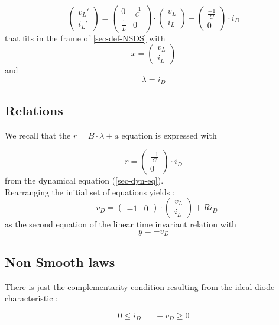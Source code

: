 \documentclass[10pt]{article}
\begin{document}
\[
\left( \begin{array}{c}
v_L'\\
i_L'
\end{array} \right)
=
\left( \begin{array}{cc}
0 & \frac{-1}{C}\\
\frac{1}{L} & 0
\end{array} \right)
 \cdot
\left( \begin{array}{c}
v_L\\
i_L
\end{array} \right)
+
\left( \begin{array}{c}
\frac{-1}{C}\\
 0
\end{array} \right)
 \cdot i_D
\]
that fits in the frame of \ref{sec-def-NSDS} with
\[
x =
\left( \begin{array}{c}
v_L\\
i_L
\end{array} \right)
\]
and
\[
\lambda = i_D
\]



\subsection{Relations}
We recall that the $r = B \cdot \lambda + a$ equation is expressed with

\[
r =
\left( \begin{array}{c}
\frac{-1}{C}\\
 0
\end{array} \right)
 \cdot i_D
\]
from the dynamical equation (\ref{sec-dyn-eq}).\\
Rearranging the initial set of equations yields :
\[
-v_D =
\left( \begin{array}{cc}
-1 & 0
\end{array} \right)
 \cdot
\left( \begin{array}{c}
v_L\\
i_L
\end{array} \right)
+ R i_D
\]
as the second equation of the linear time invariant relation with
\[
y = -v_D
\]



\subsection{Non Smooth laws}
\label{Non Smooth laws}
There is just the complementarity condition resulting from the ideal diode characteristic :

\[
0 \leq i_D \, \perp \, -v_D \geq 0
\]
\end{document}
